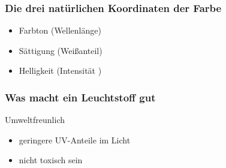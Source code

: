 \documentclass{beamer}
\begin{document}
 

\begin{frame}[t]\frametitle{Die drei natürlichen Koordinaten der Farbe}
    

\begin{itemize}
      \item Farbton (Wellenlänge) %
      \item Sättigung (Weißanteil) %
      \item Helligkeit (Intensität ) %
    \end{itemize}
 \end{frame}


\begin{frame}[t]\frametitle{Was macht ein Leuchtstoff gut}
  \begin{beamerboxesrounded}[]{Umweltfreunlich}
  \begin{itemize}
   \item geringere UV-Anteile im Licht 
   \item nicht toxisch sein 
  \end{itemize}
  \end{beamerboxesrounded}
 
\end{frame}
\end{document}
